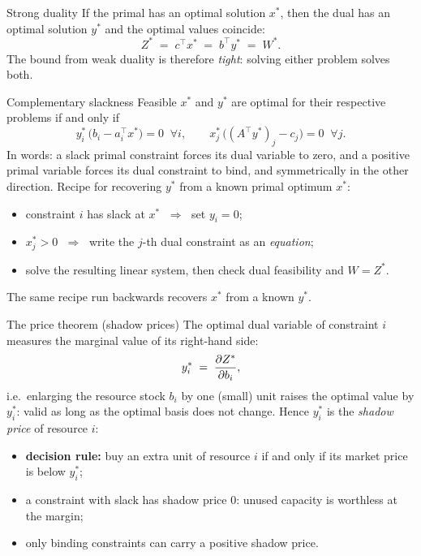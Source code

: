 \begin{rulebox}{Strong duality}
If the primal has an optimal solution $x^{*}$, then the dual has an
optimal solution $y^{*}$ and the optimal values coincide:
\[
  Z^{*} \;=\; c^{\top}x^{*} \;=\; b^{\top}y^{*} \;=\; W^{*} .
\]
The bound from weak duality is therefore \emph{tight}: solving either
problem solves both.
\end{rulebox}

\begin{rulebox}{Complementary slackness}
Feasible $x^{*}$ and $y^{*}$ are optimal for their respective problems if
and only if
\[
  y_{i}^{*}\,\bigl(b_{i}-a_{i}^{\top}x^{*}\bigr)=0 \;\;\forall i,
  \qquad
  x_{j}^{*}\,\bigl((A^{\top}y^{*})_{j}-c_{j}\bigr)=0 \;\;\forall j .
\]
In words: a slack primal constraint forces its dual variable to zero, and
a positive primal variable forces its dual constraint to bind, and
symmetrically in the other direction. Recipe for recovering $y^{*}$ from a
known primal optimum $x^{*}$:
\begin{itemize}[leftmargin=1.6em,itemsep=0.3ex]
  \item constraint $i$ has slack at $x^{*}$ $\;\Rightarrow\;$ set
        $y_{i}=0$;
  \item $x_{j}^{*}>0$ $\;\Rightarrow\;$ write the $j$-th dual constraint
        as an \emph{equation};
  \item solve the resulting linear system, then check dual feasibility and
        $W=Z^{*}$.
\end{itemize}
The same recipe run backwards recovers $x^{*}$ from a known $y^{*}$.
\end{rulebox}

\begin{rulebox}{The price theorem (shadow prices)}
The optimal dual variable of constraint $i$ measures the marginal value of
its right-hand side:
\[
  y_{i}^{*} \;=\; \frac{\partial Z^{*}}{\partial b_{i}} ,
\]
i.e.\ enlarging the resource stock $b_{i}$ by one (small) unit raises the
optimal value by $y_{i}^{*}$: valid as long as the optimal basis does not
change. Hence $y_{i}^{*}$ is the \emph{shadow price} of resource $i$:
\begin{itemize}[leftmargin=1.6em,itemsep=0.3ex]
  \item \textbf{decision rule:} buy an extra unit of resource $i$ if and
        only if its market price is below $y_{i}^{*}$;
  \item a constraint with slack has shadow price $0$: unused capacity is
        worthless at the margin;
  \item only binding constraints can carry a positive shadow price.
\end{itemize}
\end{rulebox}

